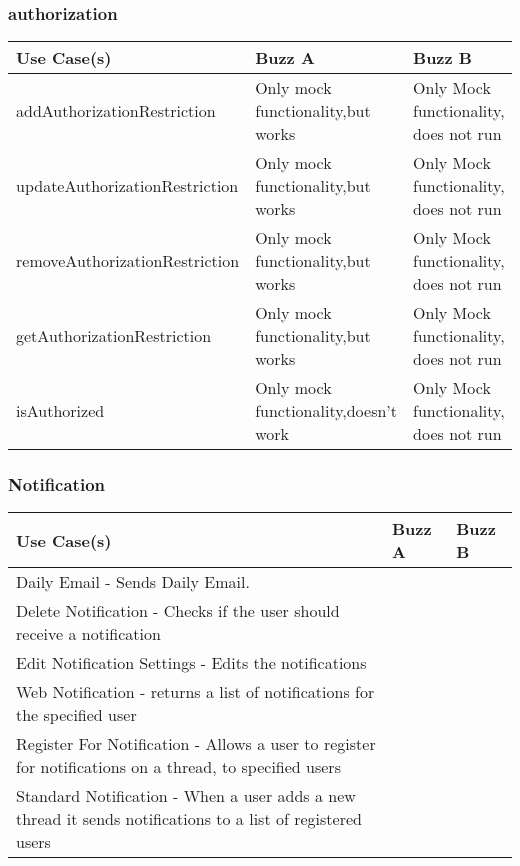 \documentclass[12pt]{article}
\begin{document}
\subsubsection{authorization}%
\begin{tabular}{|p{4.5cm}|p{4.5cm}|p{4.5cm}|}

\hline
Use Case(s) & Buzz A & Buzz B \\ 
\hline
addAuthorizationRestriction & Only mock functionality,but works & Only Mock functionality, does not run\\ %
\hline
updateAuthorizationRestriction & Only mock functionality,but works & Only Mock functionality, does not run\\ %
\hline
removeAuthorizationRestriction & Only mock functionality,but works & Only Mock functionality, does not run\\ %
\hline
getAuthorizationRestriction & Only mock functionality,but works & Only Mock functionality, does not run\\ %
\hline
isAuthorized & Only mock functionality,doesn't work & Only Mock functionality, does not run\\ %
\hline

\end{tabular}
\subsubsection{Notification}%
\begin{tabular}{|p{4.5cm}|p{4.5cm}|p{4.5cm}|}

\hline
Use Case(s) & Buzz A & Buzz B \\ 
\hline
Daily Email - Sends Daily Email. & & \\ %
\hline
Delete Notification - Checks if the user should receive a notification & &\\ %
\hline
Edit Notification Settings - Edits the notifications  & &\\ %
\hline
Web Notification - returns a list of notifications for the specified user & & \\ %
\hline
Register For Notification - Allows a user to register for notifications on a thread, to specified users  & & \\ %
\hline
Standard Notification - When a user adds a new thread it sends notifications to a list of registered users & & \\ %
\hline


\end{tabular}
\end{document}
